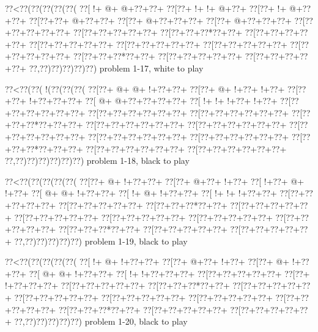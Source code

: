 \vbox{\vbox{\goo
\0??<\0??(\0??(\0??(\0??(\0??(
\0??[\- !+\- @+\- @+\0??+\0??+
\0??[\0??+\- !+\- !+\- @+\0??+
\0??[\0??+\- !+\- @+\0??+\0??+
\0??[\0??+\0??+\- @+\0??+\0??+
\0??[\0??+\- @+\0??+\0??+\0??+
\0??[\0??+\- @+\0??+\0??+\0??+
\0??[\0??+\0??+\0??+\0??+\0??+
\0??[\0??+\0??+\0??+\0??+\0??+
\0??[\0??+\0??+\0??*\0??+\0??+
\0??[\0??+\0??+\0??+\0??+\0??+
\0??[\0??+\0??+\0??+\0??+\0??+
\0??[\0??+\0??+\0??+\0??+\0??+
\0??[\0??+\0??+\0??+\0??+\0??+
\0??[\0??+\0??+\0??+\0??+\0??+
\0??[\0??+\0??+\0??*\0??+\0??+
\0??[\0??+\0??+\0??+\0??+\0??+
\0??[\0??+\0??+\0??+\0??+\0??+
\0??,\0??)\0??)\0??)\0??)\0??)
}
\hfil problem 1-17, white to play\hfil\break
}

\vbox{\vbox{\goo
\0??<\0??(\0??(\- !(\0??(\0??(\0??(
\0??[\0??+\- @+\- @+\- !+\0??+\0??+
\0??[\0??+\- @+\- !+\0??+\- !+\0??+
\0??[\0??+\0??+\- !+\0??+\0??+\0??+
\0??[\- @+\- @+\0??+\0??+\0??+\0??+
\0??[\- !+\- !+\- !+\0??+\- !+\0??+
\0??[\0??+\0??+\0??+\0??+\0??+\0??+
\0??[\0??+\0??+\0??+\0??+\0??+\0??+
\0??[\0??+\0??+\0??+\0??+\0??+\0??+
\0??[\0??+\0??+\0??*\0??+\0??+\0??+
\0??[\0??+\0??+\0??+\0??+\0??+\0??+
\0??[\0??+\0??+\0??+\0??+\0??+\0??+
\0??[\0??+\0??+\0??+\0??+\0??+\0??+
\0??[\0??+\0??+\0??+\0??+\0??+\0??+
\0??[\0??+\0??+\0??+\0??+\0??+\0??+
\0??[\0??+\0??+\0??*\0??+\0??+\0??+
\0??[\0??+\0??+\0??+\0??+\0??+\0??+
\0??[\0??+\0??+\0??+\0??+\0??+\0??+
\0??,\0??)\0??)\0??)\0??)\0??)\0??)
}
\hfil problem 1-18, black to play\hfil\break
}

\vbox{\vbox{\goo
\0??<\0??(\0??(\0??(\0??(\0??(
\0??[\0??+\- @+\- !+\0??+\0??+
\0??[\0??+\- @+\0??+\- !+\0??+
\0??[\- !+\0??+\- @+\- !+\0??+
\0??[\- @+\- @+\- !+\0??+\0??+
\0??[\- !+\- @+\- !+\0??+\0??+
\0??[\- !+\- !+\- !+\0??+\0??+
\0??[\0??+\0??+\0??+\0??+\0??+
\0??[\0??+\0??+\0??+\0??+\0??+
\0??[\0??+\0??+\0??*\0??+\0??+
\0??[\0??+\0??+\0??+\0??+\0??+
\0??[\0??+\0??+\0??+\0??+\0??+
\0??[\0??+\0??+\0??+\0??+\0??+
\0??[\0??+\0??+\0??+\0??+\0??+
\0??[\0??+\0??+\0??+\0??+\0??+
\0??[\0??+\0??+\0??*\0??+\0??+
\0??[\0??+\0??+\0??+\0??+\0??+
\0??[\0??+\0??+\0??+\0??+\0??+
\0??,\0??)\0??)\0??)\0??)\0??)
}
\hfil problem 1-19, black to play\hfil\break
}

\vbox{\vbox{\goo
\0??<\0??(\0??(\0??(\0??(\0??(
\0??[\- !+\- @+\- !+\0??+\0??+
\0??[\0??+\- @+\0??+\- !+\0??+
\0??[\0??+\- @+\- !+\0??+\0??+
\0??[\- @+\- @+\- !+\0??+\0??+
\0??[\- !+\- !+\0??+\0??+\0??+
\0??[\0??+\0??+\0??+\0??+\0??+
\0??[\0??+\- !+\0??+\0??+\0??+
\0??[\0??+\0??+\0??+\0??+\0??+
\0??[\0??+\0??+\0??*\0??+\0??+
\0??[\0??+\0??+\0??+\0??+\0??+
\0??[\0??+\0??+\0??+\0??+\0??+
\0??[\0??+\0??+\0??+\0??+\0??+
\0??[\0??+\0??+\0??+\0??+\0??+
\0??[\0??+\0??+\0??+\0??+\0??+
\0??[\0??+\0??+\0??*\0??+\0??+
\0??[\0??+\0??+\0??+\0??+\0??+
\0??[\0??+\0??+\0??+\0??+\0??+
\0??,\0??)\0??)\0??)\0??)\0??)
}
\hfil problem 1-20, black to play\hfil\break
}

